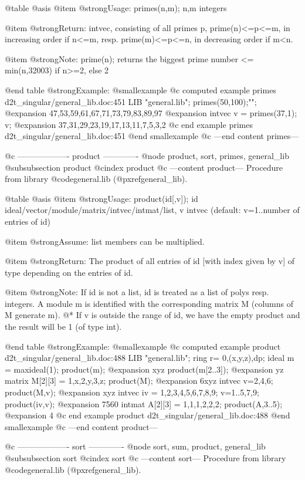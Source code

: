 @table @asis
@item @strong{Usage:}
primes(n,m); n,m integers

@item @strong{Return:}
intvec, consisting of all primes p, prime(n)<=p<=m, in increasing
order if n<=m, resp. prime(m)<=p<=n, in decreasing order if m<n.

@item @strong{Note:}
prime(n); returns the biggest prime number <= min(n,32003)
if n>=2, else 2

@end table
@strong{Example:}
@smallexample
@c computed example primes d2t_singular/general_lib.doc:451 
LIB "general.lib";
primes(50,100);"";
@expansion{} 47,53,59,61,67,71,73,79,83,89,97
@expansion{} 
intvec v = primes(37,1); v;
@expansion{} 37,31,29,23,19,17,13,11,7,5,3,2
@c end example primes d2t_singular/general_lib.doc:451
@end smallexample
@c ---end content primes---

@c ------------------- product -------------
@node product, sort, primes, general_lib
@subsubsection product
@cindex product
@c ---content product---
Procedure from library @code{general.lib} (@pxref{general_lib}).

@table @asis
@item @strong{Usage:}
product(id[,v]); id ideal/vector/module/matrix/intvec/intmat/list,
v intvec (default: v=1..number of entries of id)

@item @strong{Assume:}
list members can be multiplied.

@item @strong{Return:}
The product of all entries of id [with index given by v] of type
depending on the entries of id.

@item @strong{Note:}
If id is not a list, id is treated as a list of polys resp. integers.
A module m is identified with the corresponding matrix M (columns
of M generate m).
@* If v is outside the range of id, we have the empty product and the
result will be 1 (of type int).

@end table
@strong{Example:}
@smallexample
@c computed example product d2t_singular/general_lib.doc:488 
LIB "general.lib";
ring r= 0,(x,y,z),dp;
ideal m = maxideal(1);
product(m);
@expansion{} xyz
product(m[2..3]);
@expansion{} yz
matrix M[2][3] = 1,x,2,y,3,z;
product(M);
@expansion{} 6xyz
intvec v=2,4,6;
product(M,v);
@expansion{} xyz
intvec iv = 1,2,3,4,5,6,7,8,9;
v=1..5,7,9;
product(iv,v);
@expansion{} 7560
intmat A[2][3] = 1,1,1,2,2,2;
product(A,3..5);
@expansion{} 4
@c end example product d2t_singular/general_lib.doc:488
@end smallexample
@c ---end content product---

@c ------------------- sort -------------
@node sort, sum, product, general_lib
@subsubsection sort
@cindex sort
@c ---content sort---
Procedure from library @code{general.lib} (@pxref{general_lib}).

